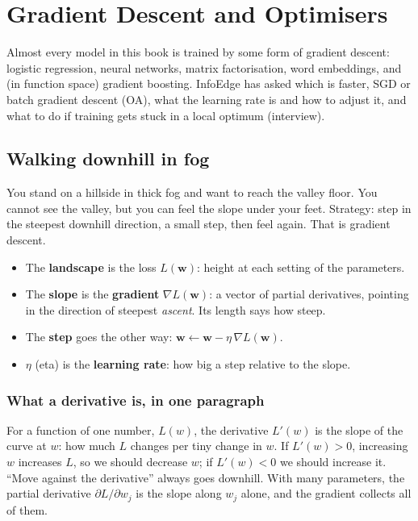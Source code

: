 \chapter{Gradient Descent and Optimisers}

Almost every model in this book is trained by some form of gradient descent: logistic regression, neural networks,
matrix factorisation, word embeddings, and (in function space) gradient boosting. InfoEdge has asked which is faster,
SGD or batch gradient descent (OA), what the learning rate is and how to adjust it, and what to do if training gets
stuck in a local optimum (interview).

\section{Walking downhill in fog}
You stand on a hillside in thick fog and want to reach the valley floor. You cannot see the valley, but you can feel
the slope under your feet. Strategy: step in the steepest downhill direction, a small step, then feel again. That is
gradient descent.

\begin{itemize}
\item The \textbf{landscape} is the loss $L(\mathbf w)$: height at each setting of the parameters.
\item The \textbf{slope} is the \textbf{gradient} $\nabla L(\mathbf w)$: a vector of partial derivatives, pointing in the
  direction of steepest \emph{ascent}. Its length says how steep.
\item The \textbf{step} goes the other way: $\mathbf w \leftarrow \mathbf w - \eta\,\nabla L(\mathbf w)$.
\item $\eta$ (eta) is the \textbf{learning rate}: how big a step relative to the slope.
\end{itemize}

\subsection{What a derivative is, in one paragraph}
For a function of one number, $L(w)$, the derivative $L'(w)$ is the slope of the curve at $w$: how much $L$ changes per
tiny change in $w$. If $L'(w) > 0$, increasing $w$ increases $L$, so we should decrease $w$; if $L'(w) < 0$ we should
increase it. ``Move against the derivative'' always goes downhill. With many parameters, the partial derivative
$\partial L/\partial w_j$ is the slope along $w_j$ alone, and the gradient collects all of them.

